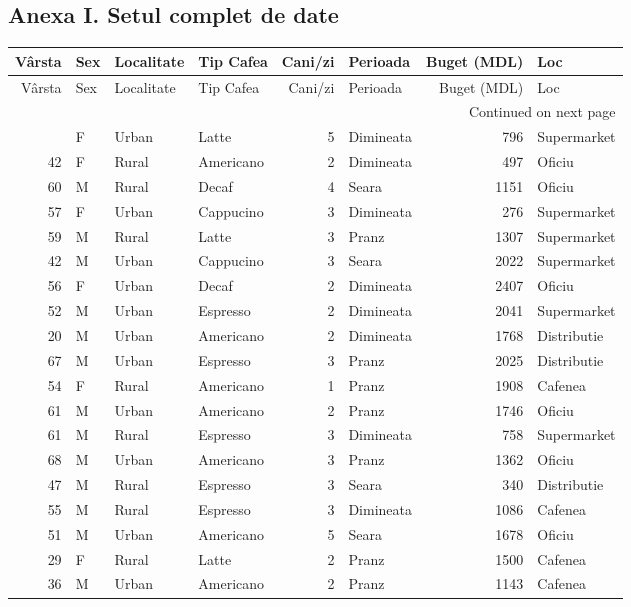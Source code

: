 \documentclass[12pt,a4paper]{report}
\begin{document}
\begin{appendices}
\appendix
\section*{Anexa I. Setul complet de date}
\begin{longtable}{rlllrlrl}
\toprule
Vârsta & Sex & Localitate & Tip Cafea & Cani/zi & Perioada & Buget (MDL) & Loc \\
\midrule
\endfirsthead
\toprule
Vârsta & Sex & Localitate & Tip Cafea & Cani/zi & Perioada & Buget (MDL) & Loc \\
\midrule
\endhead
\midrule
\multicolumn{8}{r}{Continued on next page} \\
\midrule
\endfoot
\bottomrule
\endlastfoot
18 & F & Urban & Latte & 5 & Dimineata & 796 & Supermarket \\
42 & F & Rural & Americano & 2 & Dimineata & 497 & Oficiu \\
60 & M & Rural & Decaf & 4 & Seara & 1151 & Oficiu \\
57 & F & Urban & Cappucino & 3 & Dimineata & 276 & Supermarket \\
59 & M & Rural & Latte & 3 & Pranz & 1307 & Supermarket \\
42 & M & Urban & Cappucino & 3 & Seara & 2022 & Supermarket \\
56 & F & Urban & Decaf & 2 & Dimineata & 2407 & Oficiu \\
52 & M & Urban & Espresso & 2 & Dimineata & 2041 & Supermarket \\
20 & M & Urban & Americano & 2 & Dimineata & 1768 & Distributie \\
67 & M & Urban & Espresso & 3 & Pranz & 2025 & Distributie \\
54 & F & Rural & Americano & 1 & Pranz & 1908 & Cafenea \\
61 & M & Urban & Americano & 2 & Pranz & 1746 & Oficiu \\
61 & M & Rural & Espresso & 3 & Dimineata & 758 & Supermarket \\
68 & M & Urban & Americano & 3 & Pranz & 1362 & Oficiu \\
47 & M & Rural & Espresso & 3 & Seara & 340 & Distributie \\
55 & M & Rural & Espresso & 3 & Dimineata & 1086 & Cafenea \\
51 & M & Urban & Americano & 5 & Seara & 1678 & Oficiu \\
29 & F & Rural & Latte & 2 & Pranz & 1500 & Cafenea \\
36 & M & Urban & Americano & 2 & Pranz & 1143 & Cafenea \\

\end{longtable}
\end{appendices}
\end{document}

